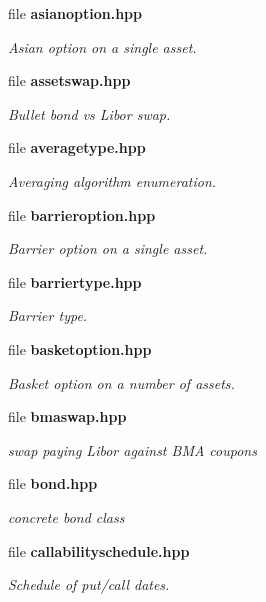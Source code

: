 \begin{DoxyCompactItemize}
\item 
file {\bf asianoption.\+hpp}
\begin{DoxyCompactList}\small\item\em Asian option on a single asset. \end{DoxyCompactList}\item 
file {\bf assetswap.\+hpp}
\begin{DoxyCompactList}\small\item\em Bullet bond vs Libor swap. \end{DoxyCompactList}\item 
file {\bf averagetype.\+hpp}
\begin{DoxyCompactList}\small\item\em Averaging algorithm enumeration. \end{DoxyCompactList}\item 
file {\bf barrieroption.\+hpp}
\begin{DoxyCompactList}\small\item\em Barrier option on a single asset. \end{DoxyCompactList}\item 
file {\bf barriertype.\+hpp}
\begin{DoxyCompactList}\small\item\em Barrier type. \end{DoxyCompactList}\item 
file {\bf basketoption.\+hpp}
\begin{DoxyCompactList}\small\item\em Basket option on a number of assets. \end{DoxyCompactList}\item 
file {\bf bmaswap.\+hpp}
\begin{DoxyCompactList}\small\item\em swap paying Libor against B\+MA coupons \end{DoxyCompactList}\item 
file {\bf bond.\+hpp}
\begin{DoxyCompactList}\small\item\em concrete bond class \end{DoxyCompactList}\item 
file {\bf callabilityschedule.\+hpp}
\begin{DoxyCompactList}\small\item\em Schedule of put/call dates. \end{DoxyCompactList}\item 

\end{DoxyCompactItemize}
